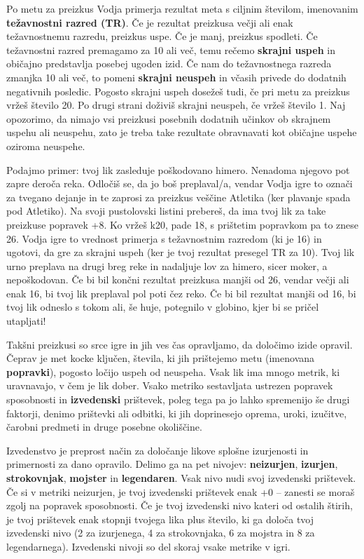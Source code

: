 Po metu za preizkus Vodja primerja rezultat meta s ciljnim številom, imenovanim \textbf{težavnostni razred (TR)}. Če je rezultat preizkusa večji ali enak težavnostnemu razredu, preizkus uspe. Če je manj, preizkus spodleti. Če težavnostni razred premagamo za 10 ali več, temu rečemo \textbf{skrajni uspeh} in običajno predstavlja posebej ugoden izid. Če nam do težavnostnega razreda zmanjka 10 ali več, to pomeni \textbf{skrajni neuspeh} in včasih privede do dodatnih negativnih posledic. Pogosto skrajni uspeh dosežeš tudi, če pri metu za preizkus vržeš število 20. Po drugi strani doživiš skrajni neuspeh, če vržeš število 1. Naj opozorimo, da nimajo vsi preizkusi posebnih dodatnih učinkov ob skrajnem uspehu ali neuspehu, zato je treba take rezultate obravnavati kot običajne uspehe oziroma neuspehe.

Podajmo primer: tvoj lik zasleduje poškodovano himero. Nenadoma njegovo pot zapre deroča reka. Odločiš se, da jo boš preplaval/a, vendar Vodja igre to označi za tvegano dejanje in te zaprosi za preizkus veščine Atletika (ker plavanje spada pod Atletiko). Na svoji pustolovski listini prebereš, da ima tvoj lik za take preizkuse popravek +8. Ko vržeš k20, pade 18, s prištetim popravkom pa to znese 26. Vodja igre to vrednost primerja s težavnostnim razredom (ki je 16) in ugotovi, da gre za skrajni uspeh (ker je tvoj rezultat presegel TR za 10). Tvoj lik urno preplava na drugi breg reke in nadaljuje lov za himero, sicer moker, a nepoškodovan. Če bi bil končni rezultat preizkusa manjši od 26, vendar večji ali enak 16, bi tvoj lik preplaval pol poti čez reko. Če bi bil rezultat manjši od 16, bi tvoj lik odneslo s tokom ali, še huje, potegnilo v globino, kjer bi se pričel utapljati!

Takšni preizkusi so srce igre in jih ves čas opravljamo, da določimo izide opravil. Čeprav je met kocke ključen, števila, ki jih prištejemo metu (imenovana \textbf{popravki}), pogosto ločijo uspeh od neuspeha. Vsak lik ima mnogo metrik, ki uravnavajo, v čem je lik dober. Vsako metriko sestavljata ustrezen popravek sposobnosti in \textbf{izvedenski} prištevek, poleg tega pa jo lahko spremenijo še drugi faktorji, denimo prištevki ali odbitki, ki jih doprinesejo oprema, uroki, izučitve, čarobni predmeti in druge posebne okoliščine.

Izvedenstvo je preprost način za določanje likove splošne izurjenosti in primernosti za dano opravilo. Delimo ga na pet nivojev: \textbf{neizurjen}, \textbf{izurjen}, \textbf{strokovnjak}, \textbf{mojster} in \textbf{legendaren}. Vsak nivo nudi svoj izvedenski prištevek. Če si v metriki neizurjen, je tvoj izvedenski prištevek enak +0 -- zanesti se moraš zgolj na popravek sposobnosti. Če je tvoj izvedenski nivo kateri od ostalih štirih, je tvoj prištevek enak stopnji tvojega lika plus število, ki ga določa tvoj izvedenski nivo (2 za izurjenega, 4 za strokovnjaka, 6 za mojstra in 8 za legendarnega). Izvedenski nivoji so del skoraj vsake metrike v igri.

